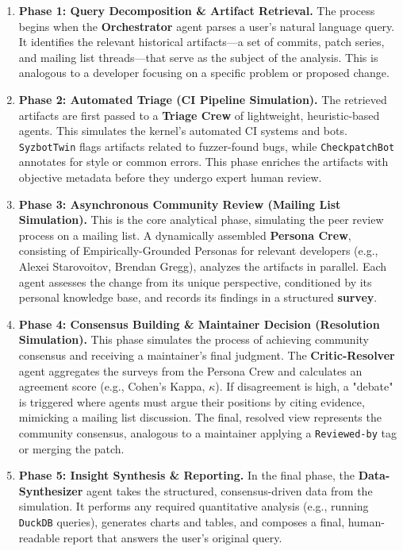 \begin{enumerate}
\item \textbf{Phase 1: Query Decomposition \& Artifact Retrieval.} The process begins when the \textbf{Orchestrator} agent parses a user's natural language query. It identifies the relevant historical artifacts—a set of commits, patch series, and mailing list threads—that serve as the subject of the analysis. This is analogous to a developer focusing on a specific problem or proposed change.

\item \textbf{Phase 2: Automated Triage (CI Pipeline Simulation).} The retrieved artifacts are first passed to a \textbf{Triage Crew} of lightweight, heuristic-based agents. This simulates the kernel's automated CI systems and bots. \texttt{SyzbotTwin} flags artifacts related to fuzzer-found bugs, while \texttt{CheckpatchBot} annotates for style or common errors. This phase enriches the artifacts with objective metadata before they undergo expert human review.

\item \textbf{Phase 3: Asynchronous Community Review (Mailing List Simulation).} This is the core analytical phase, simulating the peer review process on a mailing list. A dynamically assembled \textbf{Persona Crew}, consisting of Empirically-Grounded Personas for relevant developers (e.g., Alexei Starovoitov, Brendan Gregg), analyzes the artifacts in parallel. Each agent assesses the change from its unique perspective, conditioned by its personal knowledge base, and records its findings in a structured \textbf{survey}.

\item \textbf{Phase 4: Consensus Building \& Maintainer Decision (Resolution Simulation).} This phase simulates the process of achieving community consensus and receiving a maintainer's final judgment. The \textbf{Critic-Resolver} agent aggregates the surveys from the Persona Crew and calculates an agreement score (e.g., Cohen's Kappa, $\kappa$). If disagreement is high, a "debate" is triggered where agents must argue their positions by citing evidence, mimicking a mailing list discussion. The final, resolved view represents the community consensus, analogous to a maintainer applying a \texttt{Reviewed-by} tag or merging the patch.

\item \textbf{Phase 5: Insight Synthesis \& Reporting.} In the final phase, the \textbf{Data-Synthesizer} agent takes the structured, consensus-driven data from the simulation. It performs any required quantitative analysis (e.g., running \texttt{DuckDB} queries), generates charts and tables, and composes a final, human-readable report that answers the user's original query.
\end{enumerate}


